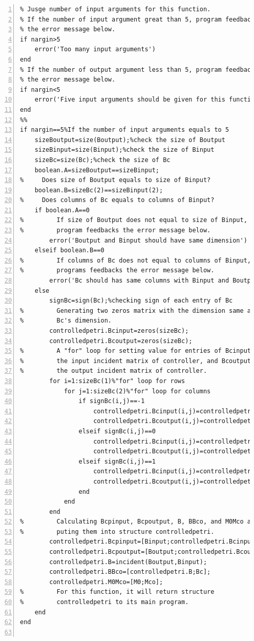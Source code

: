 \documentclass[11pt]{article}
\begin{document}
\begin{flushleft}
\begin{lstlisting}[numbers=left]
%% 
% Jusge number of input arguments for this function.
% If the number of input argument great than 5, program feedbacks
% the error message below.
if nargin>5
    error('Too many input arguments')
end
% If the number of output argument less than 5, program feedbacks
% the error message below.
if nargin<5
    error('Five input arguments should be given for this function')
end
%% 
if nargin==5%If the number of input arguments equals to 5
    sizeBoutput=size(Boutput);%check the size of Boutput
    sizeBinput=size(Binput);%check the size of Binput
    sizeBc=size(Bc);%check the size of Bc
    boolean.A=sizeBoutput==sizeBinput;
%     Does size of Boutput equals to size of Binput?
    boolean.B=sizeBc(2)==sizeBinput(2);
%     Does columns of Bc equals to columns of Binput?
    if boolean.A==0
%         If size of Boutput does not equal to size of Binput,
%         program feedbacks the error message below.
        error('Boutput and Binput should have same dimension')
    elseif boolean.B==0
%         If columns of Bc does not equal to columns of Binput,
%         programs feedbacks the error message below.
        error('Bc should has same columns with Binput and Boutput')
    else
        signBc=sign(Bc);%checking sign of each entry of Bc
%         Generating two zeros matrix with the dimension same as
%         Bc's dimension.
        controlledpetri.Bcinput=zeros(sizeBc);
        controlledpetri.Bcoutput=zeros(sizeBc);
%         A "for" loop for setting value for entries of Bcinput,
%         the input incident matrix of controller, and Bcoutput,
%         the output incident matrix of controller.
        for i=1:sizeBc(1)%"for" loop for rows
            for j=1:sizeBc(2)%"for" loop for columns
                if signBc(i,j)==-1
                    controlledpetri.Bcinput(i,j)=controlledpetri.Bcinput(i,j)-Bc(i,j);
                    controlledpetri.Bcoutput(i,j)=controlledpetri.Bcoutput(i,j);
                elseif signBc(i,j)==0
                    controlledpetri.Bcinput(i,j)=controlledpetri.Bcinput(i,j);
                    controlledpetri.Bcoutput(i,j)=controlledpetri.Bcoutput(i,j);
                elseif signBc(i,j)==1
                    controlledpetri.Bcinput(i,j)=controlledpetri.Bcinput(i,j);
                    controlledpetri.Bcoutput(i,j)=controlledpetri.Bcoutput(i,j)+Bc(i,j);
                end 
            end
        end
%         Calculating Bcpinput, Bcpoutput, B, BBco, and M0Mco and
%         puting them into structure controlledpetri.
        controlledpetri.Bcpinput=[Binput;controlledpetri.Bcinput];
        controlledpetri.Bcpoutput=[Boutput;controlledpetri.Bcoutput];
        controlledpetri.B=incident(Boutput,Binput);
        controlledpetri.BBco=[controlledpetri.B;Bc];
        controlledpetri.M0Mco=[M0;Mco];
%         For this function, it will return structure
%         controlledpetri to its main program.
    end
end


\end{lstlisting}
\end{flushleft}
\end{document}
